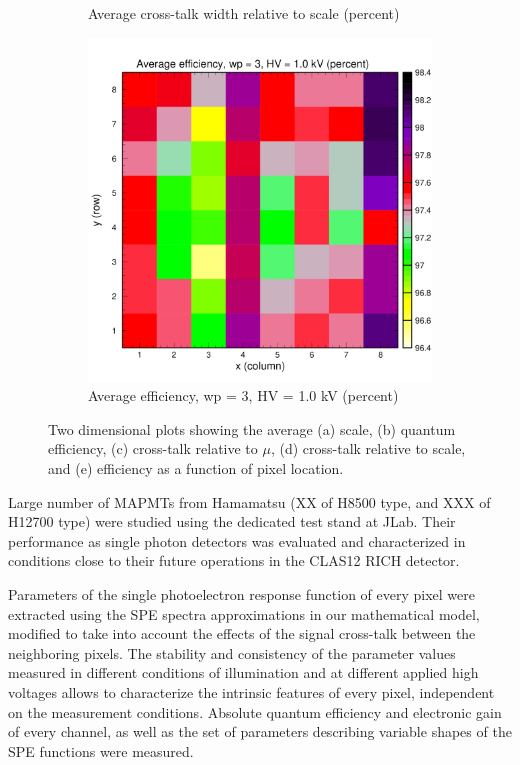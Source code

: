 \begin{figure}[hbt]
\begin{subfigure}[c]{0.4\linewidth}
		\caption{Average cross-talk width relative to scale (percent)}
		\vspace{0mm}
	\end{subfigure}%
	\vspace{3mm}
	\begin{subfigure}[c]{0.4\linewidth}
		\centering
		\includegraphics[width=\linewidth, trim={0mm 0mm 0mm 19mm},clip]{figures/pglobal_eff2d.pdf}
		\caption{Average efficiency, wp = 3, HV = 1.0 kV (percent)}
		\vspace{0mm}
	\end{subfigure}%
	\caption{Two dimensional plots showing the average (a) scale, (b) quantum efficiency, (c) cross-talk relative to $\mu$, (d) cross-talk relative to scale, and (e) efficiency as a function of pixel location.}
	\label{fig:2d_avg_fit_results}
\end{figure}



Large number of MAPMTs from Hamamatsu (XX of H8500 type, and XXX of H12700 type) were studied using the dedicated test stand at JLab. Their performance as single photon detectors was evaluated and characterized in conditions close to their future operations in the CLAS12 RICH detector.


Parameters of the single photoelectron response function of every pixel were extracted using the SPE spectra approximations in our mathematical model, modified to take into account the effects of the signal cross-talk between the neighboring pixels. The stability and consistency of the parameter values measured in different conditions of illumination and at different applied high voltages allows to characterize the intrinsic features of every pixel, independent on the measurement conditions. Absolute quantum efficiency and electronic gain of every channel, as well as the set of parameters describing variable shapes of the SPE functions were measured.


